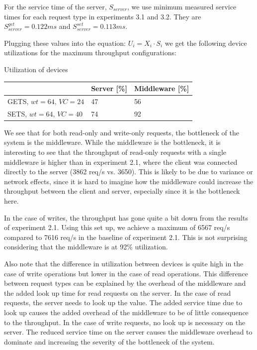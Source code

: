 \documentclass[11pt,a4paper]{article}
\begin{document}
For the service time of the server, $S_{server}$, we use minimum measured service times for each request type in experiments 3.1 and 3.2. They are $S_{server}^{get} = 0.122 ms$ and $S_{server}^{set} = 0.113 ms$.

Plugging these values into the equation: $U_i = X_i \cdot S_i$ we get the following device utilizations for the maximum throughput configurations:

\begin{center}
	{Utilization of devices\\}
	\begin{tabular}{|l|p{3cm}|p{3cm}|}
		\hline        & Server  [\%]                 & Middleware [\%]                             \\ 
		\hline GETS,  $wt=64$, $VC=24$     &    47       &       56         \\ 
		\hline SETS,  $wt=64$, $VC=40$     &    74       &       92        \\ 
		\hline 
	\end{tabular}
\end{center}

We see that for both read-only and write-only requests, the bottleneck of the system is the middleware. While the middleware is the bottleneck, it is interesting to see that the throughput of read-only requests with a single middleware is higher than in experiment 2.1, where the client was connected directly to the server (3862 req/s vs. 3650). This is likely to be due to variance or network effects, since it is hard to imagine how the middleware could increase the throughput between the client and server, especially since it is the bottleneck here.

In the case of writes, the throughput has gone quite a bit down from the results of experiment 2.1. Using this set up, we achieve a maximum of 6567 req/s compared to 7616 req/s in the baseline of experiment 2.1. This is not surprising considering that the middleware is at 92\% utilization.

Also note that the difference in utilization between devices is quite high in the case of write operations but lower in the case of read operations. This difference between request types can be explained by the overhead of the middleware and the added look up time for read requests on the server. In the case of read requests, the server needs to look up the value. The added service time due to look up causes the added overhead of the middleware to be of little consequence to the throughput. In the case of write requests, no look up is necessary on the server. The reduced service time on the server causes the middleware overhead to dominate and increasing the severity of the bottleneck of the system. 
\end{document}
